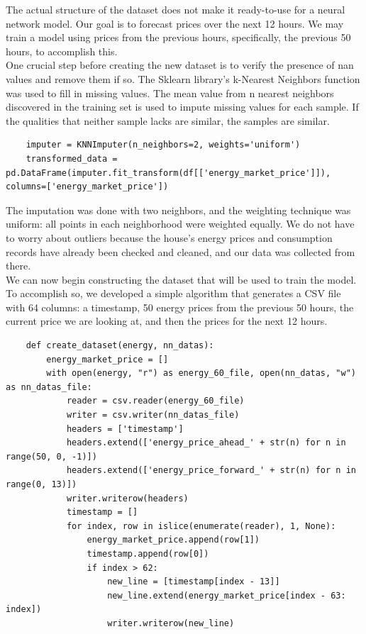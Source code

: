 The actual structure of the dataset does not make it ready-to-use for a neural network model. Our goal is to forecast prices over the next 12 hours. We may train a model using prices from the previous hours, specifically, the previous 50 hours, to accomplish this. \\
One crucial step before creating the new dataset is to verify the presence of nan values and remove them if so. The Sklearn library's k-Nearest Neighbors function was used to fill in missing values. The mean value from n nearest neighbors discovered in the training set is used to impute missing values for each sample. If the qualities that neither sample lacks are similar, the samples are similar.
\begin{verbatim}
    imputer = KNNImputer(n_neighbors=2, weights='uniform')
    transformed_data = pd.DataFrame(imputer.fit_transform(df[['energy_market_price']]), columns=['energy_market_price'])
\end{verbatim}
The imputation was done with two neighbors, and the weighting technique was uniform: all points in each neighborhood were weighted equally. We do not have to worry about outliers because the house's energy prices and consumption records have already been checked and cleaned, and our data was collected from there. \\
We can now begin constructing the dataset that will be used to train the model. To accomplish so, we developed a simple algorithm that generates a CSV file with 64 columns: a timestamp, 50 energy prices from the previous 50 hours, the current price we are looking at, and then the prices for the next 12 hours.
\begin{verbatim}
    def create_dataset(energy, nn_datas):
        energy_market_price = []
        with open(energy, "r") as energy_60_file, open(nn_datas, "w") as nn_datas_file:
            reader = csv.reader(energy_60_file)
            writer = csv.writer(nn_datas_file)
            headers = ['timestamp']
            headers.extend(['energy_price_ahead_' + str(n) for n in range(50, 0, -1)])
            headers.extend(['energy_price_forward_' + str(n) for n in range(0, 13)])
            writer.writerow(headers)
            timestamp = []
            for index, row in islice(enumerate(reader), 1, None):
                energy_market_price.append(row[1])
                timestamp.append(row[0])
                if index > 62:
                    new_line = [timestamp[index - 13]]
                    new_line.extend(energy_market_price[index - 63: index])
                    writer.writerow(new_line)
\end{verbatim}
